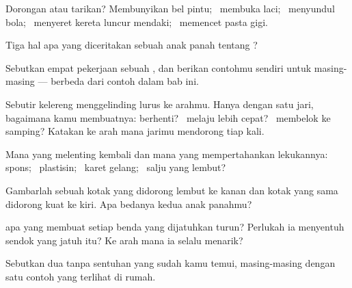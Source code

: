 \begin{exercise}[$\star$]\label{exo:g2:pushes-and-pulls:1}
Dorongan atau tarikan? Membunyikan bel pintu; \ membuka laci;
\ menyundul bola; \ menyeret kereta luncur mendaki; \ memencet pasta
gigi.
\end{exercise}

\begin{exercise}[$\star$]\label{exo:g2:pushes-and-pulls:2}
Tiga hal apa yang diceritakan sebuah anak panah  tentang ?
\end{exercise}

\begin{exercise}[$\star$]\label{exo:g2:pushes-and-pulls:3}
Sebutkan empat pekerjaan sebuah , dan berikan contohmu sendiri
untuk masing-masing --- berbeda dari contoh dalam bab ini.
\end{exercise}

\begin{exercise}[$\star$]\label{exo:g2:pushes-and-pulls:4}
Sebutir kelereng menggelinding lurus ke arahmu. Hanya dengan satu
jari, bagaimana kamu membuatnya: berhenti? \ melaju lebih cepat?
\ membelok ke samping? Katakan ke arah mana jarimu mendorong tiap kali.
\end{exercise}

\begin{exercise}[$\star$]\label{exo:g2:pushes-and-pulls:5}
Mana yang melenting kembali dan mana yang mempertahankan lekukannya:
spons; \ plastisin; \ karet gelang; \ salju yang lembut?
\end{exercise}

\begin{exercise}[$\star$]\label{exo:g2:pushes-and-pulls:6}
Gambarlah sebuah kotak yang didorong lembut ke kanan dan kotak yang
sama didorong kuat ke kiri. Apa bedanya kedua anak panahmu?
\end{exercise}

\begin{exercise}[$\star$]\label{exo:g2:pushes-and-pulls:7}
 apa yang membuat setiap benda yang dijatuhkan turun? Perlukah ia
menyentuh sendok yang jatuh itu? Ke arah mana ia selalu menarik?
\end{exercise}

\begin{exercise}[$\star$]\label{exo:g2:pushes-and-pulls:8}
Sebutkan dua  tanpa sentuhan yang sudah kamu temui, masing-masing
dengan satu contoh yang terlihat di rumah.
\end{exercise}

